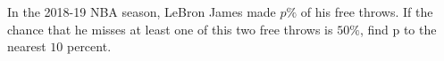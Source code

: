 In the 2018-19 NBA season, LeBron James made $p\%$ of his free throws. If the chance that he misses at least one of this two free throws is $50\%$, find p to the nearest $10$ percent.
